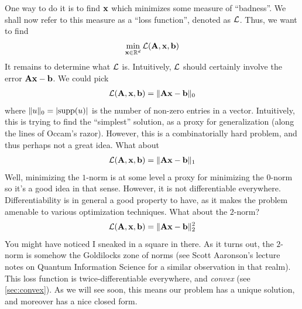 One way to do it is to find $\mathbf{x}$ which minimizes some measure of ``badness''. We shall now refer to this measure as a ``loss function'', denoted as $\mathcal{L}$. Thus, we want to find
\begin{align*}
    \min_{\mathbf{x} \in \mathbb{R}^d} \mathcal{L}(\mathbf{A}, \mathbf{x}, {\bf b})
\end{align*}
It remains to determine what $\mathcal{L}$ is. Intuitively, $\mathcal{L}$ should certainly involve the error $\mathbf{A}\mathbf{x} - {\bf b}$. We could pick
\begin{align*}
    \mathcal{L}(\mathbf{A}, \mathbf{x}, {\bf b}) = \lVert \mathbf{A}\mathbf{x} - {\bf b} \rVert_0
\end{align*}
where $\lVert u \rVert_0 = |\mathrm{supp}(u)|$ is the number of non-zero entries in a vector. Intuitively, this is trying to find the ``simplest'' solution, as a proxy for generalization (along the lines of Occam's razor). However, this is a combinatorially hard problem, and thus perhaps not a great idea. What about
\begin{align*}
    \mathcal{L}(\mathbf{A}, \mathbf{x}, {\bf b}) = \lVert \mathbf{A}\mathbf{x} - {\bf b} \rVert_1
\end{align*}
Well, minimizing the $1$-norm is at some level a proxy for minimizing the $0$-norm so it's a good idea in that sense. However, it is not differentiable everywhere. Differentiability is in general a good property to have, as it makes the problem amenable to various optimization techniques. What about the $2$-norm?
\begin{align*}
    \mathcal{L}(\mathbf{A}, \mathbf{x}, {\bf b}) = \lVert \mathbf{A}\mathbf{x} - {\bf b} \rVert_2^2
\end{align*}
You might have noticed I sneaked in a square in there. As it turns out, the $2$-norm is somehow the Goldilocks zone of norms (see Scott Aaronson's lecture notes on Quantum Information Science \cite{aaronson_2018} for a similar observation in that realm). This loss function is twice-differentiable everywhere, and {\em convex} (see \autoref{sec:convex}). As we will see soon, this means our problem has a unique solution, and moreover has a nice closed form.

